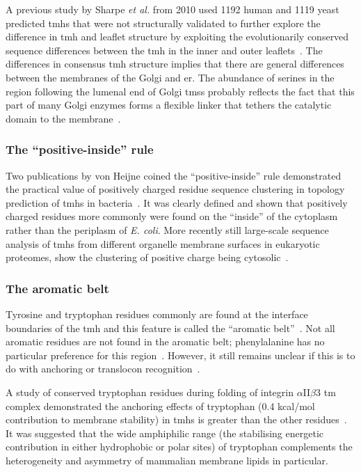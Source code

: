 A previous study by Sharpe \textit{et al.} from 2010 used 1192 human and 1119 yeast predicted \gls{tmh}s that were not structurally validated to further explore the difference in \gls{tmh} and leaflet structure by exploiting the evolutionarily conserved sequence differences between the \gls{tmh} in the inner and outer leaflets~\cite{Sharpe2010}.
The differences in consensus \gls{tmh} structure implies that there are general differences between the membranes of the Golgi and \gls{er}.
The abundance of serines in the region following the lumenal end of Golgi \gls{tms}s probably reflects the fact that this part of many Golgi enzymes forms a flexible linker that tethers the catalytic domain to the membrane~\cite{Sharpe2010}.

\subsubsection{The ``positive\--inside'' rule}

Two publications by von Heijne coined the ``positive-inside'' rule demonstrated the practical value of positively charged residue sequence clustering in topology prediction of \gls{tmh}s in bacteria~\cite{VonHeijne1989,Andersson1992}.
It was clearly defined and shown that positively charged residues more commonly were found on the ``inside'' of the cytoplasm rather than the periplasm of \textit{ E.
coli}.
More recently still large-scale sequence analysis of \gls{tmh}s from different organelle membrane surfaces in eukaryotic proteomes, show the clustering of positive charge being cytosolic~\cite{Sharpe2010, Baeza-Delgado2013, Pogozheva2013}.

\subsubsection{The aromatic belt}

Tyrosine and tryptophan residues commonly are found at the interface boundaries of the \gls{tmh} and this feature is called the ``aromatic belt''~\cite{Hessa2005, Granseth2005, Sharpe2010, Baeza-Delgado2013, Nilsson2005a}.
Not all aromatic residues are not found in the aromatic belt; phenylalanine has no particular preference for this region~\cite{Granseth2005, Braun1999}.
However, it still remains unclear if this is to do with anchoring or translocon recognition~\cite{Baeza-Delgado2013}.

A study of conserved tryptophan residues during folding of integrin $\alpha$II$\beta$3 \gls{tm} complex demonstrated the anchoring effects of tryptophan (0.4 kcal/mol contribution to membrane stability) in \gls{tmh}s is greater than the other residues~\cite{Situ2018}. It was suggested that the wide amphiphilic range (the stabilising energetic contribution in either hydrophobic or polar sites) of tryptophan complements the heterogeneity and asymmetry of mammalian membrane lipids in particular.

